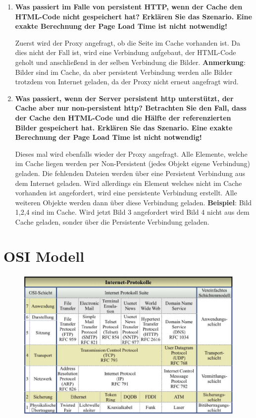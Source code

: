 \documentclass{article}
\begin{document}
\begin{enumerate}
	\item \textbf{Was passiert im Falle von persistent HTTP, wenn der Cache den HTML-Code nicht gespeichert hat? Erklären Sie das Szenario. Eine exakte Berechnung der Page Load Time ist nicht notwendig!}
	\begin{flushleft}
		Zuerst wird der Proxy angefragt, ob die Seite im Cache vorhanden ist. Da dies nicht der Fall ist, wird eine Verbindung aufgebaut, der HTML-Code geholt und anschließend in der selben Verbindung die Bilder.\linebreak
		\textbf{Anmerkung}: Bilder sind im Cache, da aber persistent Verbindung werden alle Bilder trotzdem von Internet geladen, da der Proxy nicht erneut angefragt wird.
	\end{flushleft}
	\item \textbf{Was passiert, wenn der Server persistent http unterstützt, der Cache aber nur non-persistent http? Betrachten Sie den Fall, dass der Cache den HTML-Code und die Hälfte der referenzierten Bilder gespeichert hat. Erklären Sie das Szenario. Eine exakte Berechnung der Page Load Time ist nicht notwendig!}
	\begin{flushleft}
		Dieses mal wird ebenfalls wieder der Proxy angefragt. Alle Elemente, welche im Cache liegen werden per Non-Persistent (jedes Objekt eigene Verbindung) geladen. Die fehlenden Dateien werden über eine Persistent Verbindung aus dem Internet geladen. Wird allerdings ein Element welches nicht im Cache vorhanden ist angefordert, wird eine persistente Verbindung erstellt. Alle weiteren Objekte werden dann über diese Verbindung geladen.\linebreak
		\textbf{Beispiel}: Bild 1,2,4 sind im Cache. Wird jetzt Bild 3 angefordert wird Bild 4 nicht aus dem Cache geladen, sonder über die Persistente Verbindung geladen.
	\end{flushleft}
	
\end{enumerate}

\newpage
\section{OSI Modell}
\begin{figure}[!ht]
	\centering
	\includegraphics[scale=0.5]{media/OSI-Modell}
\end{figure}
\end{document}
